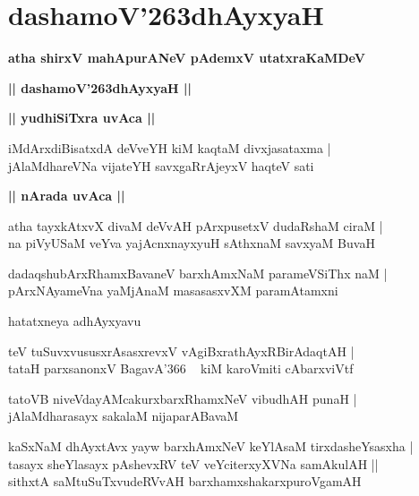 \documentclass[twoside,12pt,openright]{book}
\def\S{\char'263}
\newcounter{shloka}[chapter]
\def\uvaca#1{\centerline{{\large\textbf{#1}}}}
\begin{document}
\chapter{dashamoV\S dhAyxyaH}

\begin{center}
{\LARGE\bfseries atha shirxV mahApurANeV pAdemxV utatxraKaMDeV} 
\end{center}

\begin{center}
{\LARGE\bfseries  || dashamoV\S dhAyxyaH ||}
\end{center}

\uvaca{|| yudhiSiTxra uvAca ||}

\begin{shloka}%
iMdArxdiBisatxdA deVveYH kiM kaqtaM divxjasataxma |\\
jAlaMdhareVNa vijateYH savxgaRrAjeyxV haqteV sati
\end{shloka}

\uvaca{|| nArada uvAca ||}

\begin{shloka}%
atha tayxkAtxvX divaM deVvAH pArxpusetxV dudaRshaM ciraM |\\
na piVyUSaM veYva yajAcnxnayxyuH sAthxnaM savxyaM BuvaH
\end{shloka}

\begin{shloka}%
dadaqshubArxRhamxBavaneV barxhAmxNaM parameVSiThx naM |\\
pArxNAyameVna yaMjAnaM masasasxvXM paramAtamxni
\end{shloka}

\begin{center}
hatatxneya adhAyxyavu
\end{center}

\begin{shloka}%
teV tuSuvxvususxrAsasxrevxV vAgiBxrathAyxRBirAdaqtAH |\\
tataH parxsanonxV BagavA\char'366 ~ kiM karoVmiti cAbarxviVtf 
\end{shloka}

\begin{shloka}%
tatoVB niveVdayAMcakurxbarxRhamxNeV vibudhAH punaH |\\
jAlaMdharasayx sakalaM nijaparABavaM 
\end{shloka}

\begin{shloka}%
kaSxNaM dhAyxtAvx yayw barxhAmxNeV keYlAsaM tirxdasheYsasxha |\\
tasayx sheYlasayx pAshevxRV teV veYciterxyXVNa samAkulAH ||\\
sithxtA saMtuSuTxvudeRVvAH barxhamxshakarxpuroVgamAH
\end{shloka}
\end{document}
